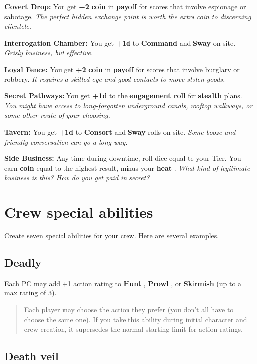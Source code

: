 \documentclass[11pt,fleqn,a5paper]{book}
\newcommand{\gameterm}[1]{\textbf{#1}}
\begin{document}
\gameterm{Covert Drop:}  You get \textbf{+2} \gameterm{coin}  in \textbf{payoff} for scores that involve espionage or sabotage. \emph{The perfect hidden exchange point is worth the extra coin to discerning clientele.}

\gameterm{Interrogation Chamber:}  You get \textbf{+1d} to \gameterm{Command}  and \gameterm{Sway}  on-site. \emph{Grisly business, but effective.}

\gameterm{Loyal Fence:}  You get \textbf{+2} \gameterm{coin}  in \textbf{payoff} for scores that involve burglary or robbery. \emph{It requires a skilled eye and good contacts to move stolen goods.}

\gameterm{Secret Pathways: }  You get \textbf{+1d} to the \textbf{engagement roll} for \textbf{stealth} plans. \emph{You might have access to long-forgotten underground canals, rooftop walkways, or some other route of your choosing.}

\gameterm{Tavern:}  You get \textbf{+1d} to \gameterm{Consort}  and \gameterm{Sway}  rolls on-site. \emph{Some booze and friendly conversation can go a long way.}

\gameterm{Side Business:}  Any time during downtime, roll dice equal to your Tier. You earn \gameterm{coin}  equal to the highest result, minus your \gameterm{heat} . \emph{What kind of legitimate business is this? How do you get paid in secret?}

\section{Crew special abilities}

Create seven special abilities for your crew. Here are several examples.

\subsection{Deadly}

Each PC may add +1 action rating to \gameterm{Hunt} , \gameterm{Prowl} , or \gameterm{Skirmish}  (up to a max rating of 3).

\begin{quote}
	Each player may choose the action they prefer (you don’t all have to choose the same one). If you take this ability during initial character and crew creation, it supersedes the normal starting limit for action ratings.
\end{quote} 

\subsection{Death veil}
\end{document}
